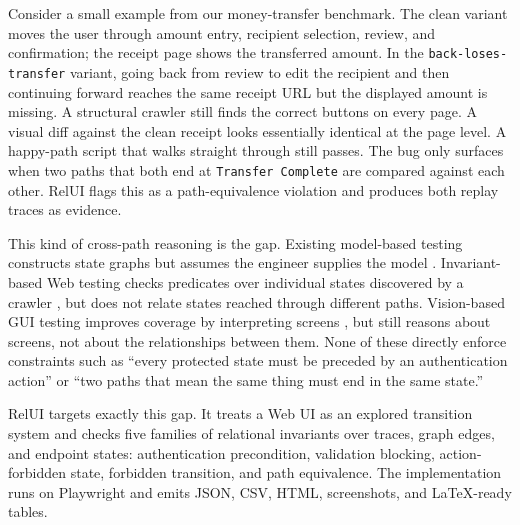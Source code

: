 \documentclass[sigconf,nonacm]{acmart}
\newcommand{\RelUI}{RelUI\xspace}
\begin{document}
Consider a small example from our money-transfer benchmark. The clean variant moves the user through amount entry, recipient selection, review, and confirmation; the receipt page shows the transferred amount. In the \texttt{back-loses-transfer} variant, going back from review to edit the recipient and then continuing forward reaches the same receipt URL but the displayed amount is missing. A structural crawler still finds the correct buttons on every page. A visual diff against the clean receipt looks essentially identical at the page level. A happy-path script that walks straight through still passes. The bug only surfaces when two paths that both end at \texttt{Transfer Complete} are compared against each other. \RelUI flags this as a path-equivalence violation and produces both replay traces as evidence.

This kind of cross-path reasoning is the gap. Existing model-based testing constructs state graphs but assumes the engineer supplies the model \citep{utting2012taxonomy}. Invariant-based Web testing checks predicates over individual states discovered by a crawler \citep{mesbah2012invariant}, but does not relate states reached through different paths. Vision-based GUI testing improves coverage by interpreting screens \citep{wang2024vetl}, but still reasons about screens, not about the relationships between them. None of these directly enforce constraints such as ``every protected state must be preceded by an authentication action'' or ``two paths that mean the same thing must end in the same state.''

\RelUI targets exactly this gap. It treats a Web UI as an explored transition system and checks five families of relational invariants over traces, graph edges, and endpoint states: authentication precondition, validation blocking, action-forbidden state, forbidden transition, and path equivalence. The implementation runs on Playwright \citep{playwright} and emits JSON, CSV, HTML, screenshots, and LaTeX-ready tables.
\end{document}
